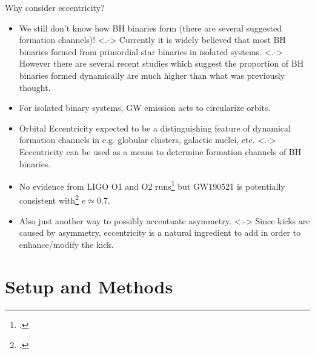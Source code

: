 \documentclass[smaller,aspectratio=169]{beamer}
\begin{document}
\begin{frame}{Why consider eccentricity?}
    \begin{itemize}
        \item<+-> 
            We still don't know how BH binaries form 
            (there are several suggested \alert{formation channels})!
        \note[item]<.->{
            Currently it is widely believed that most BH binaries formed
            from primordial star binaries in isolated systems.}
        \note[item]<.->{
            However there are several recent studies which suggest the 
            proportion of BH binaries formed dynamically are much higher
            than what was previously thought.}
        \item<+->
            For \alert{isolated binary} systems, GW emission acts to 
            circularize orbits.
        \item<+->
            Orbital Eccentricity expected to be a distinguishing feature of 
            \alert{dynamical} formation channels in e.g. globular 
            clusters, galactic nuclei, etc.
        \note[item]<.->{
            Eccentricity can be used as a means to determine formation
            channels of BH binaries.}
        \item<+->
            No evidence from LIGO O1 and O2 runs\footcite{Salemi:2019owp} 
            but GW190521 is potentially consistent with\footcite{Gayathri:2020coq} 
            $e\simeq0.7$.
        \item<+->
            Also just another way to possibly \alert{accentuate} asymmetry.
        \note[item]<.->{
            Since kicks are caused by asymmetry, eccentricity is a natural
            ingredient to add in order to enhance/modify the kick.}
    \end{itemize}
\end{frame}

\section{Setup and Methods}
\end{document}
